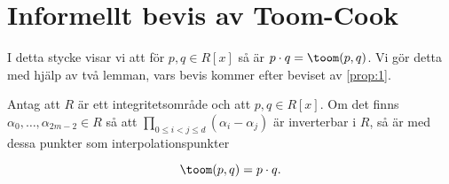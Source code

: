 \section{Informellt bevis av Toom-Cook}
\label{informhuvudbevis}
I detta stycke visar vi att för $p, q \in R[x]$ så är
$p \cdot q = \toom (p, q)$. Vi gör detta med hjälp av två lemman, vars bevis
kommer efter beviset av \ref{prop:1}.

\begin{proposition}
  \label{prop:1}
  Antag att $R$ är ett integritetsområde och att $p, q \in R[x]$. Om det finns
  $\alpha_0, \dots, \alpha_{2m-2} \in R$ så att $\prod_{0 \leq i < j \leq d}
  (\alpha_i - \alpha_j)$ är inverterbar i $R$, så är med dessa punkter som
  interpolationspunkter

  \begin{equation}
    \label{eq:name7}
    \toom (p, q) =  p \cdot q.
  \end{equation}
\end{proposition}

